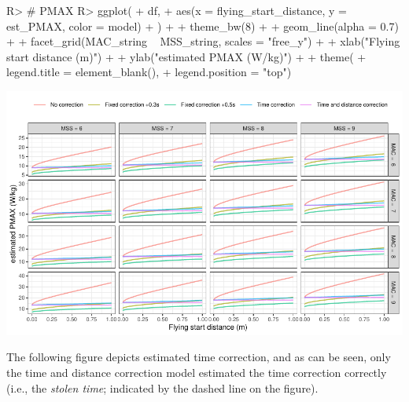 \documentclass[
]{jss}
\begin{document}
\begin{CodeChunk}
\begin{CodeInput}
R> # PMAX
R> ggplot(
+   df,
+   aes(x = flying_start_distance, y = est_PMAX, color = model)
+ ) +
+   theme_bw(8) +
+   geom_line(alpha = 0.7) +
+   facet_grid(MAC_string ~ MSS_string, scales = "free_y") +
+   xlab("Flying start distance (m)") +
+   ylab("estimated PMAX (W/kg)") +
+   theme(
+     legend.title = element_blank(),
+     legend.position = "top")
\end{CodeInput}


\begin{center}\includegraphics[width=1\linewidth]{paper_files/figure-latex/unnamed-chunk-34-1} \end{center}

\end{CodeChunk}

The following figure depicts estimated time correction, and as can be seen, only the time and distance correction model estimated the time correction correctly (i.e., the \emph{stolen time}; indicated by the dashed line on the figure).
\end{document}
